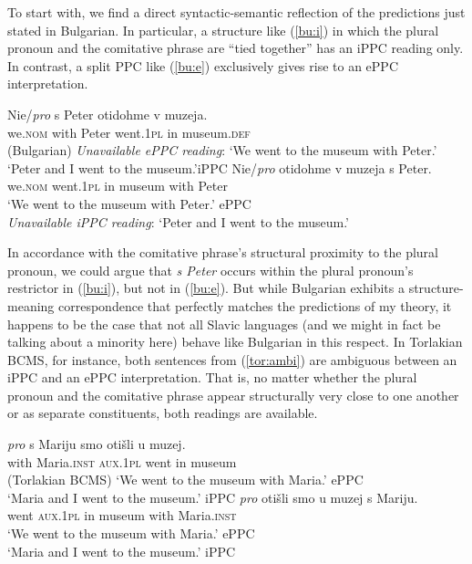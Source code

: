 \documentclass[output=paper,colorlinks,citecolor=brown]{langscibook}
\begin{document}
To start with, we find a direct syntactic-semantic reflection of the predictions just stated in Bulgarian. In particular, a structure like (\ref{bu:i}) in which the plural pronoun and the comitative phrase are ``tied together'' has an iPPC reading only. In contrast, a split PPC like (\ref{bu:e}) exclusively gives rise to an ePPC interpretation. 

\ea \ea
\gll Nie/\textit{pro} s Peter otidohme v muzeja. \\
 we.\textsc{nom} with Peter went.\textsc{1pl} in museum.\textsc{def} \\
\hfill (Bulgarian) \glt \textit{Unavailable ePPC reading}: `We went to the museum with Peter.'  \\
 `Peter and I went to the museum.'\hfill iPPC\label{bu:i}
\ex
\gll Nie/\textit{pro} otidohme v muzeja s Peter. \\
 we.\textsc{nom} went.\textsc{1pl} in museum with Peter \\
 \glt `We went to the museum with Peter.' \hfill ePPC\\
 \textit{Unavailable iPPC reading}: `Peter and I went to the museum.'\label{bu:e}
\z \z

\noindent In accordance with the comitative phrase's structural proximity to the plural pronoun, we could argue that \textit{s Peter} occurs within the plural pronoun's restrictor in (\ref{bu:i}), but not in (\ref{bu:e}). But while Bulgarian exhibits a structure-meaning correspondence that perfectly matches the predictions of my theory, it happens to be the case that not all Slavic languages (and we might in fact be talking about a minority here) behave like Bulgarian in this respect. In Torlakian BCMS, for instance, both sentences from (\ref{tor:ambi}) are ambiguous between an iPPC  and an ePPC interpretation. That is, no matter whether the plural pronoun and the comitative phrase appear structurally very close to one another or as separate constituents, both readings are available.

\ea \label{tor:ambi}
\ea
\gll \textit{pro} s Mariju smo otišli u muzej. \\
{} with Maria.\textsc{inst} \textsc{aux.1pl} went in museum \\
\hfill (Torlakian BCMS) \glt `We went to the museum with Maria.' \hfill ePPC\\
 `Maria and I went to the museum.' \hfill iPPC\label{tor:a1}
\ex
\gll \textit{pro} otišli smo u muzej s Mariju. \\
{} went \textsc{aux.1pl} in museum with Maria.\textsc{inst} \\
 \glt `We went to the museum with Maria.' \hfill ePPC\\
 `Maria and I went to the museum.' \hfill iPPC\label{tor:a2}
\z \z
\end{document}
